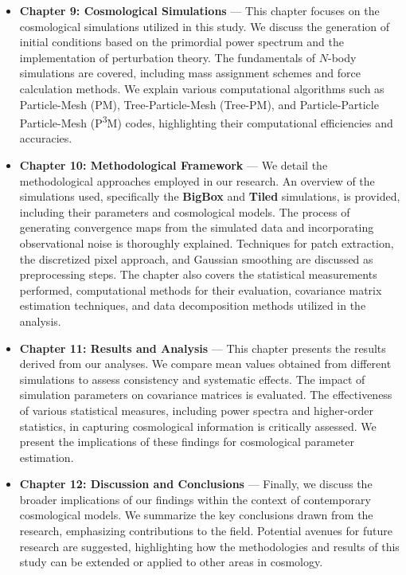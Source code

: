 \begin{itemize}
    \item \textbf{Chapter 9: Cosmological Simulations} --- This chapter focuses on the cosmological simulations utilized in this study. We discuss the generation of initial conditions based on the primordial power spectrum and the implementation of perturbation theory. The fundamentals of $N$-body simulations are covered, including mass assignment schemes and force calculation methods. We explain various computational algorithms such as Particle-Mesh (PM), Tree-Particle-Mesh (Tree-PM), and Particle-Particle Particle-Mesh (P\textsuperscript{3}M) codes, highlighting their computational efficiencies and accuracies.

    \item \textbf{Chapter 10: Methodological Framework} --- We detail the methodological approaches employed in our research. An overview of the simulations used, specifically the \textbf{BigBox} and \textbf{Tiled} simulations, is provided, including their parameters and cosmological models. The process of generating convergence maps from the simulated data and incorporating observational noise is thoroughly explained. Techniques for patch extraction, the discretized pixel approach, and Gaussian smoothing are discussed as preprocessing steps. The chapter also covers the statistical measurements performed, computational methods for their evaluation, covariance matrix estimation techniques, and data decomposition methods utilized in the analysis.

    \item \textbf{Chapter 11: Results and Analysis} --- This chapter presents the results derived from our analyses. We compare mean values obtained from different simulations to assess consistency and systematic effects. The impact of simulation parameters on covariance matrices is evaluated. The effectiveness of various statistical measures, including power spectra and higher-order statistics, in capturing cosmological information is critically assessed. We present the implications of these findings for cosmological parameter estimation.

    \item \textbf{Chapter 12: Discussion and Conclusions} --- Finally, we discuss the broader implications of our findings within the context of contemporary cosmological models. We summarize the key conclusions drawn from the research, emphasizing contributions to the field. Potential avenues for future research are suggested, highlighting how the methodologies and results of this study can be extended or applied to other areas in cosmology.
\end{itemize}

